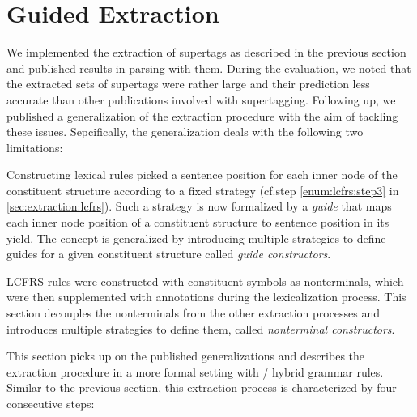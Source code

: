 \documentclass[../../document.tex]{subfiles}
\begin{document}
    \section{Guided Extraction} \label{sec:extraction:guided}
    We implemented the extraction of  supertags as described in the previous section and published results in parsing with them. \cite{RupMoe21}
    During the evaluation, we noted that the extracted sets of supertags were rather large and their prediction less accurate than other publications involved with supertagging.
    Following up, we published a generalization of the extraction procedure with the aim of tackling these issues. \citep{Rup22}
    Sepcifically, the generalization deals with the following two limitations:
    \begin{compactitem}
        \item
            Constructing lexical  rules picked a sentence position for each inner node of the constituent structure according to a fixed strategy (cf.\@ step \ref{enum:lcfrs:step3} in \cref{sec:extraction:lcfrs}).
            Such a strategy is now formalized by a \emph{guide} that maps each inner node position of a constituent structure to sentence position in its yield.
            The concept is generalized by introducing multiple strategies to define guides for a given constituent structure called \emph{guide constructors}.
        \item
            LCFRS rules were constructed with constituent symbols as nonterminals, which were then supplemented with annotations during the lexicalization process.
            This section decouples the nonterminals from the other extraction processes and introduces multiple strategies to define them, called \emph{nonterminal constructors}.
    \end{compactitem}
    This section picks up on the published generalizations and describes the extraction procedure in a more formal setting with / hybrid grammar rules.
    Similar to the previous section, this extraction process is characterized by four consecutive steps:
\end{document}
